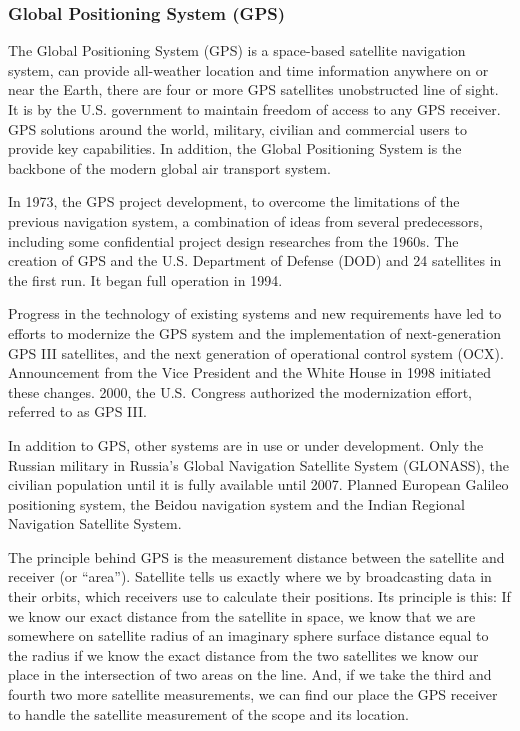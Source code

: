 \documentclass[12pt,a4paper,titlepage]{article}
\begin{document}
\subsubsection{Global Positioning System (GPS)} %
\label{ssub:global_positioning_system_gps_}
The Global Positioning System (GPS) is a space-based satellite navigation system, can provide all-weather location and time information anywhere on or near the Earth, there are four or more GPS satellites unobstructed line of sight. It is by the U.S. government to maintain freedom of access to any GPS receiver. GPS solutions around the world, military, civilian and commercial users to provide key capabilities. In addition, the Global Positioning System is the backbone of the modern global air transport system. \cite{wiki-gps}

In 1973, the GPS project development, to overcome the limitations of the previous navigation system, a combination of ideas from several predecessors, including some confidential project design researches from the 1960s. \cite{national1995global} The creation of GPS and the U.S. Department of Defense (DOD) and 24 satellites in the first run. It began full operation in 1994.

Progress in the technology of existing systems and new requirements have led to efforts to modernize the GPS system and the implementation of next-generation GPS III satellites, and the next generation of operational control system (OCX). \cite{gpsocx} Announcement from the Vice President and the White House in 1998 initiated these changes. 2000, the U.S. Congress authorized the modernization effort, referred to as GPS III.

In addition to GPS, other systems are in use or under development. Only the Russian military in Russia's Global Navigation Satellite System (GLONASS), the civilian population until it is fully available until 2007. Planned European Galileo positioning system, the Beidou navigation system and the Indian Regional Navigation Satellite System.

The principle behind GPS is the measurement distance between the satellite and receiver (or ``area''). Satellite tells us exactly where we by broadcasting data in their orbits, which receivers use to calculate their positions. Its principle is this: If we know our exact distance from the satellite in space, we know that we are somewhere on satellite radius of an imaginary sphere surface distance equal to the radius if we know the exact distance from the two satellites we know our place in the intersection of two areas on the line. And, if we take the third and fourth two more satellite measurements, we can find our place the GPS receiver to handle the satellite measurement of the scope and its location. \cite{gpsprimer}
\end{document}

